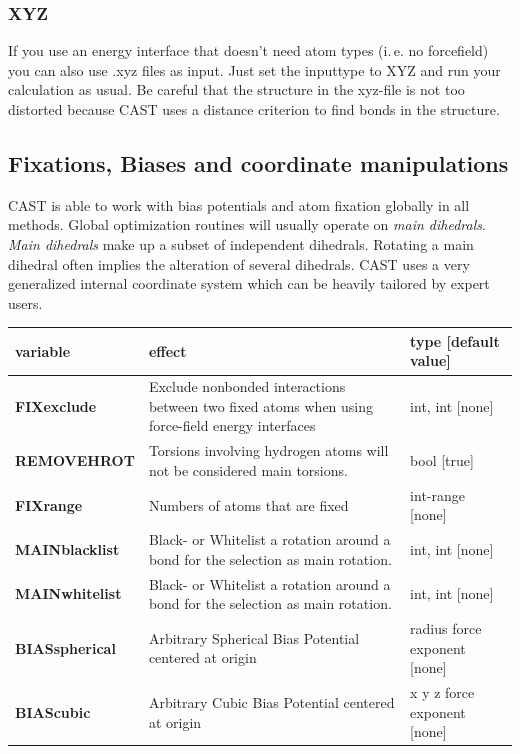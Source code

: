 \documentclass[10pt,a4paper]{article} %
\begin{document}
\subsubsection{XYZ}

If you use an energy interface that doesn't need atom types (i.\,e. no forcefield) you can also use .xyz files as input. Just set the inputtype to XYZ and run your calculation as usual. Be careful that the structure in the xyz-file is not too distorted because CAST uses a distance criterion to find bonds in the structure.


\subsection{Fixations, Biases and coordinate manipulations}
\ac{CAST} is able to work with bias potentials and atom fixation globally in all methods. Global optimization routines will usually operate on \textit{main dihedrals}. \textit{Main dihedrals} make up a subset of independent dihedrals. Rotating a main dihedral often implies the alteration of several dihedrals. \ac{CAST} uses a very generalized internal coordinate system which can be heavily tailored by expert users.
\begin{longtable}{|p{3.5cm}|p{5cm}|p{3cm}|}
	variable & effect & type [default value] \\
	\hline
	\textbf{FIXexclude} & Exclude nonbonded interactions between two fixed atoms when using force-field energy interfaces & int, int [none] \\
	\textbf{REMOVEHROT} & Torsions involving hydrogen atoms will not be considered main torsions. & bool [true] \\	
	\textbf{FIXrange} & Numbers of atoms that are fixed & int-range [none] \\
	\textbf{MAINblacklist} & Black- or Whitelist a rotation around a bond for the selection as main rotation. & int, int [none] \\
	\textbf{MAINwhitelist} & Black- or Whitelist a rotation around a bond for the selection as main rotation. & int, int [none] \\
	\textbf{BIASspherical} & Arbitrary Spherical Bias Potential centered at origin & radius force exponent [none] \\
	\textbf{BIAScubic} & Arbitrary Cubic Bias Potential centered at origin & x y z force exponent [none] \\
\end{longtable} 
	
\end{document}
